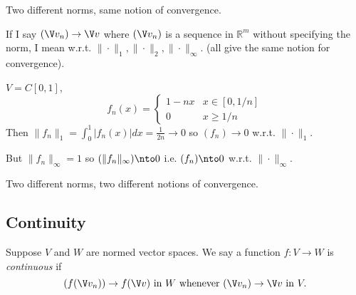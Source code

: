 \documentclass[a4paper]{article}
\theoremstyle{definition}
\begin{document}
\begin{rmk}
  Two different norms, same notion of convergence.
\end{rmk}

\begin{convention}
  If I say $(\V v_n)\to \V v$ where $(\V v_n)$ is a sequence in $\mathbb{R}^m$ without specifying the norm, I mean w.r.t. $\|\cdot\|_1,\|\cdot\|_2,\|\cdot\|_\infty$. (all give the same notion for convergence).
\end{convention}

\begin{eg}\label{eg:fdown}
  $V=C[0,1]$,
  \[
    f_n(x) =
    \begin{cases}
      1-nx & x\in[0,1/n] \\
      0 & x\geq 1/n
    \end{cases}
  \]
  Then $\|f_n\|_1=\int_0^1|f_n(x)| dx=\frac{1}{2n}\to 0$ so $(f_n)\to 0$ w.r.t. $\|\cdot\|_1$.

  But $\|f_n\|_\infty=1$ so $(\|f_n\|_\infty) \nto 0$ i.e. $(f_n) \nto 0$ w.r.t. $\|\cdot\|_\infty$.
\end{eg}

\begin{rmk}
  Two different norms, two different notions of convergence.
\end{rmk}

\subsection{Continuity}

\begin{defi}
  Suppose $V$ and $W$ are normed vector spaces. We say a function $f:V\to W$ is \emph{continuous} if
  \[
    (f(\V v_n))\to f(\V v) \text{ in } W \text{ whenever } (\V v_n)\to \V v \text{ in } V.
  \]
  
\end{defi}
\end{document}
